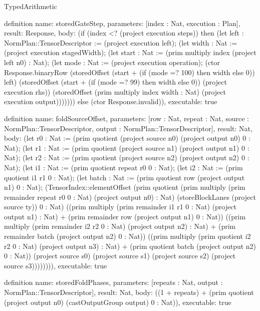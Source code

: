 \begin{lexlean}{TypedArithmetic}
\begin{semanticmodule}
definition{
  name: storedGateStep,
  parameters: [index : Nat, execution : Plan],
  result: Response,
  body: (if (index <? (project execution steps)) then
    (let left : NormPlan::TensorDescriptor := (project execution left);
    (let width : Nat := (project execution stagedWidth);
    (let start : Nat := (prim multiply index (project left n0) : Nat);
    (let mode : Nat := (project execution operation);
      (ctor Response.binaryRow (storedOffset (start + (if (mode =? 100) then width else 0)) left)
        (storedOffset (start + (if (mode =? 99) then width else 0)) (project execution rhs))
        (storedOffset (prim multiply index width : Nat) (project execution output)))))))
    else (ctor Response.invalid)),
  executable: true
}

definition{
  name: foldSourceOffset,
  parameters: [row : Nat, repeat : Nat, source : NormPlan::TensorDescriptor, output : NormPlan::TensorDescriptor],
  result: Nat,
  body: (let r0 : Nat := (prim quotient (project source n0) (project output n0) 0 : Nat);
    (let r1 : Nat := (prim quotient (project source n1) (project output n1) 0 : Nat);
    (let r2 : Nat := (prim quotient (project source n2) (project output n2) 0 : Nat);
    (let i1 : Nat := (prim quotient repeat r0 0 : Nat);
    (let i2 : Nat := (prim quotient i1 r1 0 : Nat);
    (let batch : Nat := (prim quotient row (project output n1) 0 : Nat);
    (TensorIndex::elementOffset
      (prim quotient (prim multiply (prim remainder repeat r0 0 : Nat) (project output n0) : Nat) (storeBlockLanes (project source ty)) 0 : Nat)
      ((prim multiply (prim remainder i1 r1 0 : Nat) (project output n1) : Nat) + (prim remainder row (project output n1) 0 : Nat))
      ((prim multiply (prim remainder i2 r2 0 : Nat) (project output n2) : Nat) + (prim remainder batch (project output n2) 0 : Nat))
      ((prim multiply (prim quotient i2 r2 0 : Nat) (project output n3) : Nat) + (prim quotient batch (project output n2) 0 : Nat))
      (project source s0) (project source s1) (project source s2) (project source s3)))))))),
  executable: true
}

definition{
  name: storedFoldPhases,
  parameters: [repeats : Nat, output : NormPlan::TensorDescriptor],
  result: Nat,
  body: ((1 + repeats) + (prim quotient (project output n0) (castOutputGroup output) 0 : Nat)),
  executable: true
}


\end{semanticmodule}
\end{lexlean}
